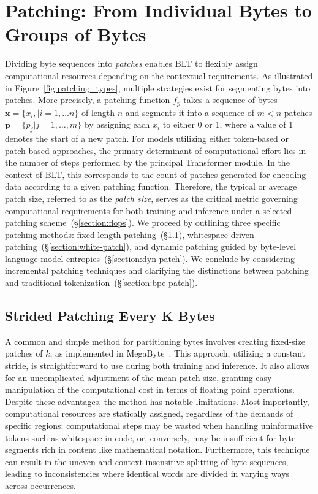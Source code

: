 \section{Patching: From Individual Bytes to Groups of Bytes}
\label{section:patching}

Dividing byte sequences into \textit{patches} enables {\textsc BLT} to flexibly assign computational resources depending on the contextual requirements. As illustrated in Figure~\ref{fig:patching_types}, multiple strategies exist for segmenting bytes into patches. More precisely, a patching function $f_p$ takes a sequence of bytes $\pmb{x}=\{x_i,|i=1,\ldots n\}$ of length $n$ and segments it into a sequence of $m < n$ patches $\pmb{p}=\{p_j|j=1,\ldots,m\}$ by assigning each $x_i$ to either 0 or 1, where a value of 1 denotes the start of a new patch. For models utilizing either token-based or patch-based approaches, the primary determinant of computational effort lies in the number of steps performed by the principal Transformer module. In the context of {\textsc BLT}, this corresponds to the count of patches generated for encoding data according to a given patching function. Therefore, the typical or average patch size, referred to as the \textit{patch size}, serves as the critical metric governing computational requirements for both training and inference under a selected patching scheme~(\S\ref{section:flops}).  
We proceed by outlining three specific patching methods: fixed-length patching~(\S\ref{section:static-patch}), whitespace-driven patching~(\S\ref{section:white-patch}), and dynamic patching guided by byte-level language model entropies~(\S\ref{section:dyn-patch}). We conclude by considering incremental patching techniques and clarifying the distinctions between patching and traditional tokenization~(\S\ref{section:bpe-patch}).

\subsection{Strided Patching Every K Bytes}
\label{section:static-patch}

A common and simple method for partitioning bytes involves creating fixed-size patches of $k$, as implemented in MegaByte~\citep{yu2023megabyte}. This approach, utilizing a constant stride, is straightforward to use during both training and inference. It also allows for an uncomplicated adjustment of the mean patch size, granting easy manipulation of the computational cost in terms of floating point operations. Despite these advantages, the method has notable limitations. Most importantly, computational resources are statically assigned, regardless of the demands of specific regions: computational steps may be wasted when handling uninformative tokens such as whitespace in code, or, conversely, may be insufficient for byte segments rich in content like mathematical notation. Furthermore, this technique can result in the uneven and context-insensitive splitting of byte sequences, leading to inconsistencies where identical words are divided in varying ways across occurrences.

